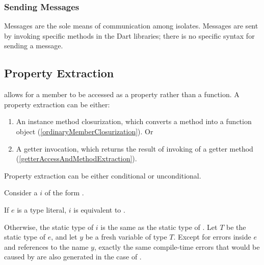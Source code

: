 \documentclass[makeidx]{article}
\begin{document}
\subsubsection{Sending Messages}

\LMHash{}%
Messages are the sole means of communication among isolates.
Messages are sent by invoking specific methods in the Dart libraries; there is no specific syntax for sending a message.



\subsection{Property Extraction}

\LMHash{}%
allows for a member to be accessed as a property rather than a function.
A property extraction can be either:
\begin{enumerate}
\item An instance method closurization,
  which converts a method into a function object
  (\ref{ordinaryMemberClosurization}).
  Or
\item A getter invocation, which returns
  the result of invoking of a getter method
  (\ref{getterAccessAndMethodExtraction}).
\end{enumerate}


Property extraction can be either conditional or unconditional.

\LMHash{}%
Consider a 
$i$ of the form .

\LMHash{}%
If $e$ is a type literal, $i$ is equivalent to .

\LMHash{}%
Otherwise, the static type of $i$ is the same as
the static type of .
Let $T$ be the static type of $e$,
and let $y$ be a fresh variable of type $T$.
Except for errors inside $e$ and references to the name $y$,
exactly the same compile-time errors that would be caused by 
are also generated in the case of .
\end{document}
